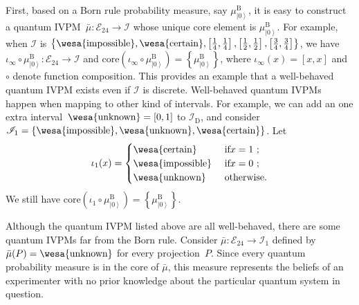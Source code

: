 \documentclass[english,reprint, aps, prl,superscriptaddress, showpacs,
showkeys]{revtex4-1}
\theoremstyle{plain}
\theoremstyle{definition}
\newcommand{\events}{\ensuremath{\mathcal{E}}}
\newcommand{\imposs}{{\mbox{\wesa{impossible}}}}
\newcommand{\necess}{{\mbox{\wesa{certain}}}}
\newcommand{\unknown}{{\mbox{\wesa{unknown}}}}
\newcommand{\ket}[1]{{\left\vert{#1}\right\rangle}}
\begin{document}
First, based on a Born rule probability measure, say $\mu_{\ket{0}}^{\mathrm{\mathrm{B}}}$,
it is easy to construct a quantum IVPM~$\bar{\mu}:\events_{24}\rightarrow\mathscr{I}$
whose unique core element is $\mu_{\ket{0}}^{\mathrm{\mathrm{B}}}$.
For example, when $\mathscr{I}$ is $\left\{ \imposs,\necess,\left[\frac{1}{4},\frac{1}{4}\right],\left[\frac{1}{2},\frac{1}{2}\right],\left[\frac{3}{4},\frac{3}{4}\right]\right\} $,
we have $\iota_{\infty}\circ\mu_{\ket{0}}^{\mathrm{\mathrm{B}}}:\events_{24}\rightarrow\mathscr{I}$
and $\mathrm{core}\left(\iota_{\infty}\circ\mu_{\ket{0}}^{\mathrm{\mathrm{B}}}\right)=\left\{ \mu_{\ket{0}}^{\mathrm{\mathrm{B}}}\right\} $,
where $\iota_{\infty}\left(x\right)=\left[x,x\right]$ and $\circ$
denote function composition. This provides an example that a well-behaved
quantum IVPM exists even if $\mathscr{I}$ is discrete. Well-behaved
quantum IVPMs happen when mapping to other kind of intervals. For
example, we can add an one extra interval~$\unknown=\left[0,1\right]$
to $\mathscr{I}_{\mathrm{D}}$, and consider $\mathscr{I}_{1}=\left\{ \imposs,\unknown,\necess\right\} $.
Let 
\begin{equation} 
\iota_1(x)=\begin{cases} 
\necess & \text{ if}x=1\text{ ;}\\ 
\imposs & \text{ if}x=0\text{ ;}\\ 
\unknown & \text{ otherwise.}
\end{cases}\label{eq:homomorphism-1} \end{equation}
We still have $\mathrm{core}\left(\iota_{1}\circ\mu_{\ket{0}}^{\mathrm{\mathrm{B}}}\right)=\left\{ \mu_{\ket{0}}^{\mathrm{\mathrm{B}}}\right\} $.

Although the quantum IVPM listed above are all well-behaved, there
are some quantum IVPMs far from the Born rule. Consider $\bar{\mu}:\events_{24}\rightarrow\mathscr{I}_{1}$
defined by $\bar{\mu}(P)=\unknown$ for every projection~$P$. Since
every quantum probability measure is in the core of $\bar{\mu}$,
this measure represents the beliefs of an experimenter with no prior
knowledge about the particular quantum system in question. 
\end{document}

